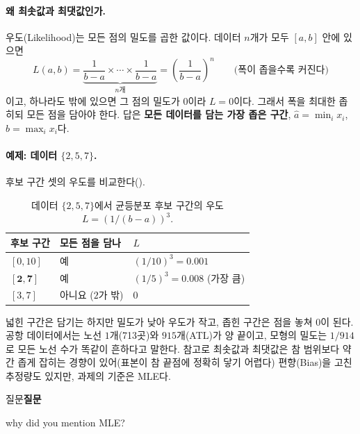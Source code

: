 \documentclass[11pt]{article}
\newenvironment{callout}[1][]
  {\par\medskip\noindent
   \begin{lrbox}{\calloutbox}\begin{minipage}{0.92\linewidth}
   \def\calloutttl{#1}\ifx\calloutttl\empty\else\textbf{#1}\par\smallskip\fi}
  {\end{minipage}\end{lrbox}%
   \fcolorbox{black!30}{black!3}{\usebox{\calloutbox}}\par\medskip}
\newcommand{\term}[1]{\textbf{#1}}
\begin{document}
\paragraph{왜 최솟값과 최댓값인가.} 우도(Likelihood)는 모든 점의 밀도를 곱한 값이다.
데이터 $n$개가 모두 $[a, b]$ 안에 있으면
\[
  L(a, b) = \underbrace{\frac{1}{b-a} \times \cdots \times \frac{1}{b-a}}_{n\text{개}}
          = \left(\frac{1}{b-a}\right)^n
  \qquad \text{(폭이 좁을수록 커진다)}
\]
이고, 하나라도 밖에 있으면 그 점의 밀도가 $0$이라 $L = 0$이다. 그래서 폭을 최대한 좁히되
모든 점을 담아야 한다. 답은 \term{모든 데이터를 담는 가장 좁은 구간},
$\hat a = \min_i x_i$, $\hat b = \max_i x_i$다.

\paragraph{예제: 데이터 $\{2, 5, 7\}$.} 후보 구간 셋의 우도를 비교한다().
\begin{table}[H]
  \centering
  \caption{데이터 $\{2, 5, 7\}$에서 균등분포 후보 구간의 우도 $L = (1/(b-a))^3$.}
  \label{tab:uniform-mle}
  \begin{tabular}{lll}
    \toprule
    후보 구간 & 모든 점을 담나 & $L$ \\
    \midrule
    $[0, 10]$ & 예 & $(1/10)^3 = 0.001$ \\
    \midrule
    $\mathbf{[2, 7]}$ & 예 & $(1/5)^3 = \mathbf{0.008}$ (가장 큼) \\
    \midrule
    $[3, 7]$ & 아니요 ($2$가 밖) & $0$ \\
    \bottomrule
  \end{tabular}
\end{table}
넓힌 구간은 담기는 하지만 밀도가 낮아 우도가 작고, 좁힌 구간은 점을 놓쳐 $0$이 된다.
공항 데이터에서는 노선 $1$개(713곳)와 $915$개(ATL)가 양 끝이고, 모형의 밀도는
$1/914$로 모든 노선 수가 똑같이 흔하다고 말한다. 참고로 최솟값과 최댓값은 참 범위보다
약간 좁게 잡히는 경향이 있어(표본이 참 끝점에 정확히 닿기 어렵다) 편향(Bias)을 고친
추정량도 있지만, 과제의 기준은 MLE다.

\begin{callout}[질문]
why did you mention MLE?
\end{callout}
\end{document}
